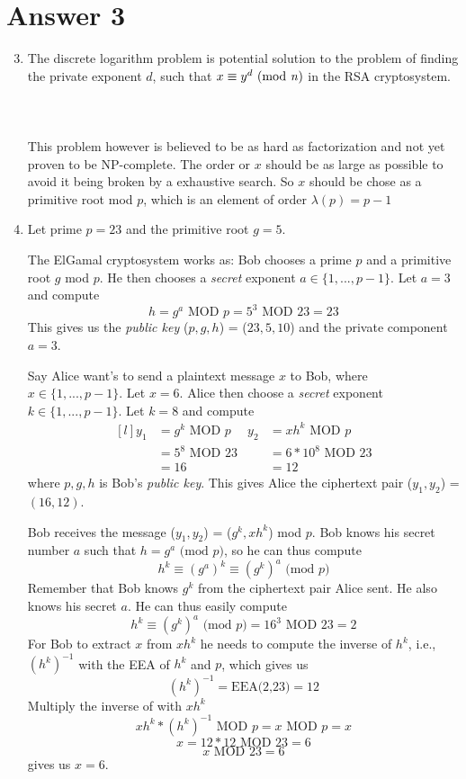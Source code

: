 \documentclass[12pt]{article}
\begin{document}
	\section*{Answer 3}
	\renewcommand{\theenumi}{\alph{enumi}}
	\renewcommand{\theenumii}{\roman{enumii}}
	\begin{enumerate}
		\setcounter{enumi}{2}
		\item The discrete logarithm problem is potential solution to the problem of finding the private exponent $d$, such that $x \equiv y^d \text{ (mod \textit{n})}$ in the RSA cryptosystem.
		\\
		\\
		\\
		\\
		This problem however is believed to be as hard as factorization and not yet proven to be NP-complete. The order or $x$ should be as large as possible to avoid it being broken by a exhaustive search. So $x$ should be chose as a primitive root mod $p$, which is an element of order $\lambda(p) = p-1$
		
		\item Let prime $p = 23$ and the primitive root $g = 5$.
		
		The ElGamal cryptosystem works as: Bob chooses a prime $p$ and a primitive root $g$ mod $p$. He then chooses a \textit{secret} exponent $a \in \{1,...,p-1\}$. Let $a=3$ and compute 
		$$
		h=g^a \text{ MOD $p$} = 5^3 \text{ MOD 23} = 23
		$$ 
		This gives us the \textit{public key} ($p,g,h$) = ($23,5,10$) and the private component $a = 3$. 
		
		Say Alice want's to send a plaintext message $x$ to Bob, where $x \in \{1,...,p-1\}$. 
		Let $x = 6$. Alice then choose a \textit{secret} exponent $k \in \{1,...,p-1\}$. Let $k = 8$ and compute 
		\[
		\begin{matrix*}[l]
			y_1&=g^k \text{ MOD $p$} & y_2&=xh^k \text{ MOD $p$}\\
			&=5^8 \text{ MOD 23} &&= 6*10^8 \text{ MOD 23}\\
			&=16 &&=12
		\end{matrix*}
		\]
		where $p,g,h$ is Bob's \textit{public key}. This gives Alice the ciphertext pair ($y_1,y_2$) = $(16,12)$.   
		
		Bob receives the message ($y_1,y_2$) = ($g^k,xh^k$) mod $p$. Bob knows his secret number $a$ such that $h=g^a \text{ (mod $p$)}$, so he can thus compute 
		$$
		h^k \equiv (g^a)^k \equiv (g^k)^a \text{ (mod $p$)}
		$$
		Remember that Bob knows $g^k$ from the ciphertext pair Alice sent. He also knows his secret $a$. He can thus easily compute 
		$$
		h^k \equiv (g^k)^a \text{ (mod $p$)} = 16^3 \text{ MOD 23} = 2
		$$
		For Bob to extract $x$ from $xh^k$ he needs to compute the inverse of $h^k$, i.e., $(h^k)^{-1}$ with the EEA of $h^k$ and $p$, which gives us $$
		(h^k)^{-1} = \text{EEA(2,23)} = 12
		$$
		Multiply the inverse of with $xh^k$ 
		$$
		xh^k*(h^k)^{-1} \text{ MOD $p$} = x \text{ MOD $p$} = x
		$$
		$$
		x = 12 * 12 \text{ MOD 23} = 6
		$$
		$$
		x \text{ MOD 23} = 6
		$$
		gives us $x = 6$.
	\end{enumerate}	
	
	
\end{document}
